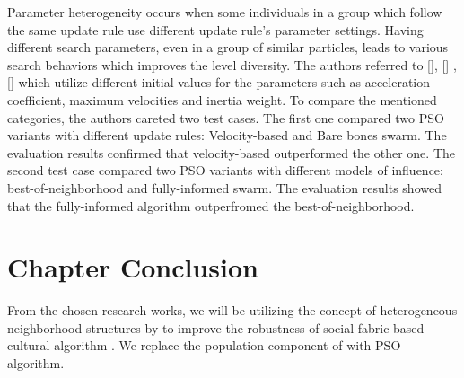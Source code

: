 Parameter heterogeneity occurs when some individuals in a group which follow the same update rule use different update rule's parameter settings. Having different search parameters, even in a group of similar particles, leads to various search behaviors which improves the level diversity. The authors referred to [], [] ,[] which utilize different initial values for the parameters such as acceleration coefficient, maximum velocities and inertia weight.\newline
To compare the mentioned categories, the authors careted two test cases. The first one compared two PSO variants with different update rules: Velocity-based and Bare bones swarm. The evaluation results confirmed that velocity-based outperformed the other one. The second test case compared two PSO variants with different models of influence: best-of-neighborhood and fully-informed swarm. The evaluation results showed that the fully-informed algorithm outperfromed the best-of-neighborhood.

\section{Chapter Conclusion}
From the chosen research works, we will be utilizing the concept of heterogeneous neighborhood structures by \cite{de2009heterogeneous} to improve the robustness of social fabric-based cultural algorithm \cite{ali2016leveraged}. We replace the population component of \cite{ali2016leveraged} with PSO algorithm.



